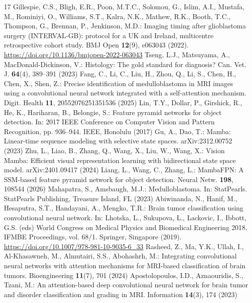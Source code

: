 \documentclass[runningheads]{llncs}
\begin{document}
\begin{thebibliography}{17}
Gillespie, C.S., Bligh, E.R., Poon, M.T.C., Solomou, G., Islim, A.I., Mustafa, M., Rominiyi, O., Williams, S.T., Kalra, N.K., Mathew, R.K., Booth, T.C., Thompson, G., Brennan, P., Jenkinson, M.D.: Imaging timing after glioblastoma surgery (INTERVAL-GB): protocol for a UK and Ireland, multicentre retrospective cohort study. BMJ Open \textbf{12}(9), e063043 (2022). \url{https://doi.org/10.1136/bmjopen-2022-063043}
Tseng, L.J., Matsuyama, A., MacDonald-Dickinson, V.: Histology: The gold standard for diagnosis? Can. Vet. J. \textbf{64}(4), 389--391 (2023)
Fang, C., Li, C., Liu, H., Zhou, Q., Li, S., Chen, H., Chen, X., Shen, Z.: Precise identification of medulloblastoma in MRI images using a convolutional neural network integrated with a self-attention mechanism. Digit. Health \textbf{11}, 20552076251351536 (2025)
Lin, T.Y., Dollar, P., Girshick, R., He, K., Hariharan, B., Belongie, S.: Feature pyramid networks for object detection. In: 2017 IEEE Conference on Computer Vision and Pattern Recognition, pp. 936--944. IEEE, Honolulu (2017)
Gu, A., Dao, T.: Mamba: Linear-time sequence modeling with selective state spaces. arXiv:2312.00752 (2023)
Zhu, L., Liao, B., Zhang, Q., Wang, X., Liu, W., Wang, X.: Vision Mamba: Efficient visual representation learning with bidirectional state space model. arXiv:2401.09417 (2024)
Liang, L., Wang, C., Zhang, L.: MambaFPN: A SSM-based feature pyramid network for object detection. Neural Netw. \textbf{198}, 108544 (2026)
Mahapatra, S., Amsbaugh, M.J.: Medulloblastoma. In: StatPearls. StatPearls Publishing, Treasure Island, FL (2023)
Abiwinanda, N., Hanif, M., Hesaputra, S.T., Handayani, A., Mengko, T.R.: Brain tumor classification using convolutional neural network. In: Lhotska, L., Sukupova, L., Lackovic, I., Ibbott, G.S. (eds) World Congress on Medical Physics and Biomedical Engineering 2018. IFMBE Proceedings, vol. 68/1. Springer, Singapore (2019). \url{https://doi.org/10.1007/978-981-10-9035-6_33}
Rasheed, Z., Ma, Y.K., Ullah, I., Al-Khasawneh, M., Almutairi, S.S., Abohashrh, M.: Integrating convolutional neural networks with attention mechanisms for MRI-based classification of brain tumors. Bioengineering \textbf{11}(7), 701 (2024)
Apostolopoulos, I.D., Aznaouridis, S., Tzani, M.: An attention-based deep convolutional neural network for brain tumor and disorder classification and grading in MRI. Information \textbf{14}(3), 174 (2023)

\end{thebibliography}
\end{document}
